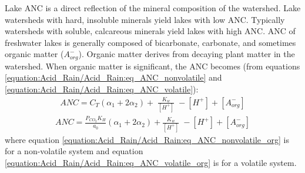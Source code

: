 \documentclass[letterpaper,10pt,english]{sphinxmanual}
\begin{document}
Lake ANC is a direct reflection of the mineral composition of the watershed. Lake watersheds with hard, insoluble minerals yield lakes with low ANC. Typically watersheds with soluble, calcareous minerals yield lakes with high ANC. ANC of freshwater lakes is generally composed of bicarbonate, carbonate, and sometimes organic matter (\({A}_{{org}}^{{-}}\)). Organic matter derives from decaying plant matter in the watershed. When organic matter is significant, the ANC becomes (from equations \eqref{equation:Acid_Rain/Acid_Rain:eq_ANC_nonvolatile} and \eqref{equation:Acid_Rain/Acid_Rain:eq_ANC_volatile}):
\begin{equation}\label{equation:Acid_Rain/Acid_Rain:eq_ANC_nonvolatile_org}
\begin{split}ANC=C_{T} (\alpha _{1} +2\alpha _{2} )+{\; }\frac{K_{w} }{\left[{H}^{+} \right]} \; -\left[{H}^{+} \right]+\left[{A}_{{org}}^{{-}} \right]\end{split}
\end{equation}\begin{equation}\label{equation:Acid_Rain/Acid_Rain:eq_ANC_volatile_org}
\begin{split}ANC=\frac{P_{CO_{2} } K_{H} }{a_{0} } (\alpha _{1} +2\alpha _{2} )+\frac{K_{w} }{\left[{H}^{+} \right]} \; -\left[{H}^{+} \right]+\left[{A}_{{org}}^{{-}} \right]\end{split}
\end{equation}
where equation \eqref{equation:Acid_Rain/Acid_Rain:eq_ANC_nonvolatile_org} is for a non-volatile system and equation \eqref{equation:Acid_Rain/Acid_Rain:eq_ANC_volatile_org} is for a volatile system.
\end{document}
